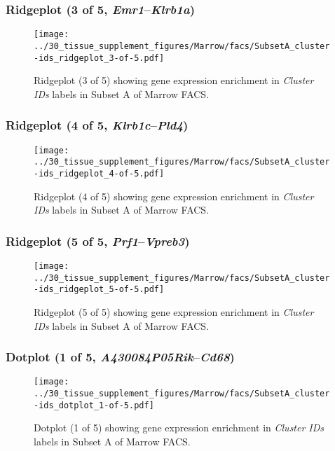 \clearpage

\subsubsection{Ridgeplot (3 of 5, \emph{Emr1}--\emph{Klrb1a})}
\begin{figure}[h]
\centering
\texttt{[image: ../30\_tissue\_supplement\_figures/Marrow/facs/SubsetA\_cluster-ids\_ridgeplot\_3-of-5.pdf]}

\caption{ Ridgeplot (3 of 5)  showing gene expression enrichment in \emph{Cluster IDs} labels in Subset A of Marrow FACS. }
\end{figure}


\clearpage

\subsubsection{Ridgeplot (4 of 5, \emph{Klrb1c}--\emph{Pld4})}
\begin{figure}[h]
\centering
\texttt{[image: ../30\_tissue\_supplement\_figures/Marrow/facs/SubsetA\_cluster-ids\_ridgeplot\_4-of-5.pdf]}

\caption{ Ridgeplot (4 of 5)  showing gene expression enrichment in \emph{Cluster IDs} labels in Subset A of Marrow FACS. }
\end{figure}


\clearpage

\subsubsection{Ridgeplot (5 of 5, \emph{Prf1}--\emph{Vpreb3})}
\begin{figure}[h]
\centering
\texttt{[image: ../30\_tissue\_supplement\_figures/Marrow/facs/SubsetA\_cluster-ids\_ridgeplot\_5-of-5.pdf]}

\caption{ Ridgeplot (5 of 5)  showing gene expression enrichment in \emph{Cluster IDs} labels in Subset A of Marrow FACS. }
\end{figure}


\clearpage

\subsubsection{Dotplot (1 of 5, \emph{A430084P05Rik}--\emph{Cd68})}
\begin{figure}[h]
\centering
\texttt{[image: ../30\_tissue\_supplement\_figures/Marrow/facs/SubsetA\_cluster-ids\_dotplot\_1-of-5.pdf]}

\caption{ Dotplot (1 of 5)  showing gene expression enrichment in \emph{Cluster IDs} labels in Subset A of Marrow FACS. }
\end{figure}


